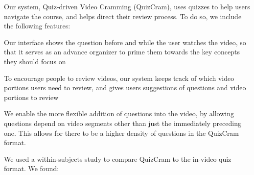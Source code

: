 \documentclass{chi-ext}
\begin{document}

Our system, Quiz-driven Video Cramming (QuizCram), uses quizzes to help users navigate the course, and helps direct their review process. To do so, we include the following features:

\begin{compactitem}
\item Our interface shows the question before and while the user watches the video, so that it serves as an advance organizer to prime them towards the key concepts they should focus on %
\item To encourage people to review videos, our system keeps track of which video portions users need to review, and gives users suggestions of questions and video portions to review %
\item We enable the more flexible addition of questions into the video, by allowing questions depend on video segments other than just the immediately preceding one. This allows for there to be a higher density of questions in the QuizCram format.
\end{compactitem}

We used a within-subjects study to compare QuizCram to the in-video quiz format. We found:
\end{document}
